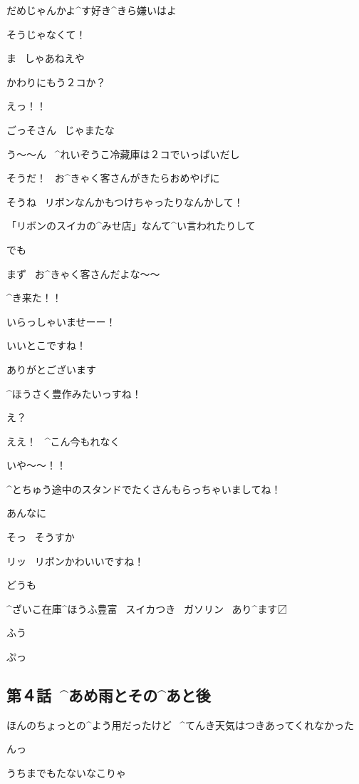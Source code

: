 \Ojisan だめじゃんかよ^{す}{好}き^{きら}{嫌}いはよ

\Alpha そうじゃなくて！

\Ojisan ま
\ しゃあねえや

\Ojisan かわりにもう２コか？

\Alpha えっ！！

\Ojisan ごっそさん
\ じゃまたな

\page[73]
\Alpha う〜〜ん
\ ^{れいぞうこ}{冷藏庫}は２コでいっぱいだし

\page[74]
\Alpha そうだ！
\ お^{きゃく}{客}さんがきたらおめやげに

\Alpha そうね
\ リボンなんかもつけちゃったりなんかして！

\Alpha 「リボンのスイカの^{みせ}{店}」なんて^{い}{言}われたりして

\Alpha でも

\Alpha まず
\ お^{きゃく}{客}さんだよな〜〜

\Alpha ^{き}{来}た！！

\page[75]
\Alpha いらっしゃいませーー！

\page[76]
\Person いいとこですね！

\Alpha ありがとございます

\Person ^{ほうさく}{豊作}みたいっすね！

\Alpha え？

\Alpha ええ！
\ ^{こん}{今}もれなく

\Person いや〜〜！！

\Person ^{とちゅう}{途中}のスタンドでたくさんもらっちゃいましてね！

\Person あんなに

\Alpha そっ
\ そうすか

\Person リッ
\ リボンかわいいですね！

\Alpha どうも

\page[77]
\Sign ^{ざいこ}{在庫}^{ほうふ}{豊富}
\ スイカつき
\ ガソリン
\ あり^{ます}{〼}

\Alpha ふう

\Alpha ぷっ


\subsection{第４話\ ^{あめ}{雨}とその^{あと}{後}}

\page[80]
\Alpha ほんのちょっとの^{よう}{用}だったけど
\ ^{てんき}{天気}はつきあってくれなかった

\Alpha んっ

\page[81]
\Alpha うちまでもたないなこりゃ

